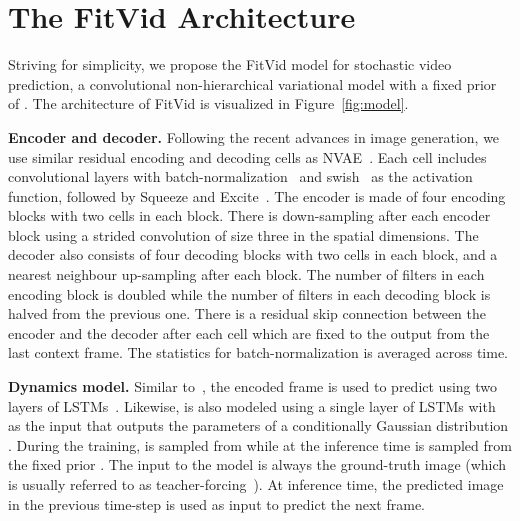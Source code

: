 \documentclass{article}
\newcommand{\model}{FitVid\xspace}
\begin{document}
\section{The \model Architecture} 
\label{sec:arc}
Striving for simplicity, we propose the \model model for stochastic video prediction, a convolutional non-hierarchical variational model with a fixed prior of . The architecture of \model is visualized in Figure~\ref{fig:model}.

\textbf{Encoder and decoder.} Following the recent advances in image generation, we use similar residual encoding and decoding cells as NVAE~\cite{vahdat2020nvae}. Each cell includes convolutional layers with batch-normalization~\cite{ioffe2015batch} and swish~\cite{ramachandran2017searching, elfwing2018sigmoid, hendrycks2016gaussian} as the activation function, followed by Squeeze and Excite~\cite{hu2018squeeze}. The encoder is made of four encoding blocks with two cells in each block. There is down-sampling after each encoder block using a strided convolution of size three in the spatial dimensions. The decoder also consists of four decoding blocks with two cells in each block, and a nearest neighbour up-sampling after each block. The number of filters in each encoding block is doubled while the number of filters in each decoding block is halved from the previous one. There is a residual skip connection between the encoder and the decoder after each cell which are fixed to the output from the last context frame. The statistics for batch-normalization is averaged across time.

\textbf{Dynamics model.} Similar to~\citet{denton2018stochastic}, the encoded frame  is used to predict  using two layers of LSTMs~\cite{hochreiter1997long}. Likewise,  is also modeled using a single layer of LSTMs with  as the input that outputs the parameters of a conditionally Gaussian distribution . During the training,  is sampled from  while at the inference time  is sampled from the fixed prior . The input to the model is always the ground-truth image (which is usually referred to as teacher-forcing~\cite{goodfellow2016deep, cenzato2019difficulty}). At inference time, the predicted image in the previous time-step is used as input to predict the next frame. 
\end{document}
